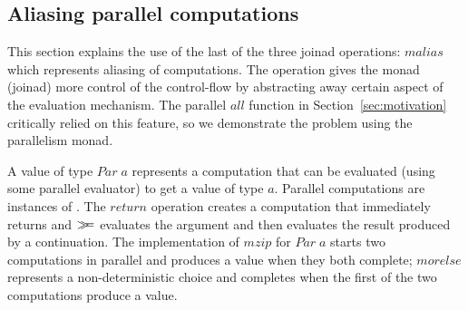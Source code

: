 \documentclass{sigplanconf}
\newcommand{\Conid}[1]{\mathit{#1}}
\newcommand{\Varid}[1]{\mathit{#1}}
\newcommand{\bind}{\mathbin{>\!\!\!>\mkern-6.7mu=}}
\begin{document}

\subsection{Aliasing parallel computations}
\label{sec:intro-aliasing-parallel}

This section explains the use of the last of the three joinad operations: \ensuremath{\Varid{malias}} which 
represents aliasing of computations. The operation gives the monad (joinad) more control of
the control-flow by abstracting away certain aspect of the evaluation mechanism.
The parallel \ensuremath{\Varid{all}} function in Section~\ref{sec:motivation} 
critically relied on this feature, so we demonstrate the problem using the parallelism monad.

A value of type \ensuremath{\Conid{Par}\;\Varid{a}} represents a computation that can be evaluated (using some parallel evaluator) 
to get a value of type \ensuremath{\Varid{a}}. Parallel computations are instances of . The \ensuremath{\Varid{return}}
operation creates a computation that immediately returns and \ensuremath{\bind } 
evaluates the argument and then evaluates the result produced by a continuation.
The implementation of \ensuremath{\Varid{mzip}} for \ensuremath{\Conid{Par}\;\Varid{a}} starts two computations in parallel and produces a value 
when they both complete; \ensuremath{\Varid{morelse}} represents a non-deterministic choice and completes when the first 
of the two computations produce a value.
\end{document}
